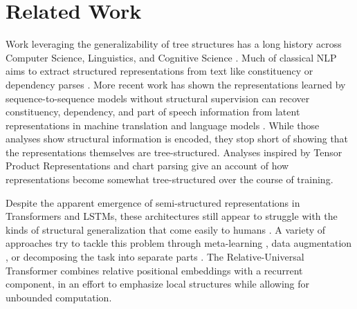 \section{Related Work}
Work leveraging the generalizability of tree structures has a long history across Computer Science, Linguistics, and Cognitive Science \citep{chomsky_aspects_1965,mccarthy1960recursive, sakai1961syntax,  smolensky_tensor_1990, steedman1987combinatory}. Much of classical NLP aims to extract structured representations from text like constituency or dependency parses \citep[for overview:][]{cuetos2013parsing, lopez2008statistical}. More recent work has shown the representations learned by sequence-to-sequence models without structural supervision can recover constituency, dependency, and part of speech information from latent representations in machine translation and language models \citep{belinkov2019analysis, blevins2018hierarchical}. While those analyses show structural information is encoded, they stop short of showing that the representations themselves are tree-structured. Analyses inspired by Tensor Product Representations \citep{mccoy2018rnns, soulos-etal-2020-discovering} and chart parsing \citep{murty2022characterizing} give an account of how representations become somewhat tree-structured over the course of training.%

Despite the apparent emergence of semi-structured representations in Transformers and LSTMs, these architectures still appear to struggle with the kinds of structural generalization that come easily to humans \citep{Lake_2018_GeneralizationSystematicityCompositional, kim_cogs_2020, keysers2020measuring}. A variety of approaches try to tackle this problem through meta-learning \citep{lake2019compositional, conklin2021meta}, data augmentation \citep{andreas_good-enough_2020}, or decomposing the task into separate parts \citep{ russin2019compositional, lindemann2023compositional}. The Relative-Universal Transformer \citep{csordas-etal-2021-devil} combines relative positional embeddings with a recurrent component, in an effort to emphasize local structures while allowing for unbounded computation.




